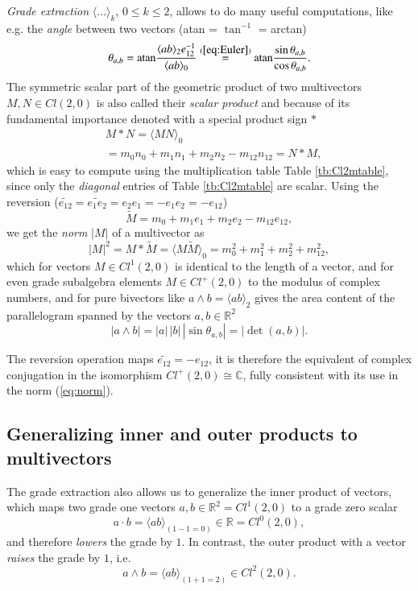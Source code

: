 \documentclass[cameraready]{jcmsi}%
\newcommand{\R}{\mathbb{R}}
\newcommand{\C}{\mathbb{C}}
\newcommand{\be}{\begin{equation}}
\newcommand{\ee}{\end{equation}}
\begin{document}
\textit{Grade extraction} $\langle \ldots \rangle_k$, $0 \leq k \leq 2$, allows to do many useful computations, like e.g. the \textit{angle} between two vectors (atan = $\tan^{-1}$ = arctan)
\be 
  \theta_{a,b} = \mathrm{atan} \frac{\langle ab \rangle_2 e_{12}^{-1}}{\langle ab \rangle_0}
               \stackrel{(\ref{eq:Euler})}{=} \mathrm{atan} \frac{\sin \theta_{a,b}}{\cos \theta_{a,b}} . 
\ee 
The symmetric scalar part of the geometric product of two multivectors $M,N \in Cl(2,0)$ is also called their \textit{scalar product} and because of its fundamental importance denoted with a special product sign $\ast$
\begin{align} 
  &M \ast N = \langle MN \rangle_0 
  \nonumber \\
  &= m_0n_0 + m_1n_1 + m_2 n_2 - m_{12}n_{12}=N\ast M ,
\end{align} 
which is easy to compute using the multiplication table Table \ref{tb:Cl2mtable}, since only the \textit{diagonal} entries of Table \ref{tb:Cl2mtable} are scalar. 
Using the reversion ($\widetilde{e_{12}}=\widetilde{e_{1}e_2}=e_2e_1 = -e_1e_2=-e_{12}$)
\be 
  \widetilde{M} = m_0 + m_1 e_1 + m_2 e_2 - m_{12} e_{12},
\ee  
we get the \textit{norm} $|M|$ of a multivector as 
\be 
  |M|^2 = M \ast \widetilde{M} = \langle M\widetilde{M} \rangle_0
  = m_0^2 + m_1^2 + m_2^2 + m_{12}^2 ,
  \label{eq:norm}
\ee 
which for vectors $M \in Cl^1(2,0)$ is identical to the length of a vector, and for even grade subalgebra elements $M \in Cl^+(2,0)$ to the modulus of complex numbers, and for pure bivectors like $a\wedge b = \langle ab \rangle_2$ gives the area content of the parallelogram spanned by the vectors $a,b \in \R^2$
\be 
  |a\wedge b| = |a|\,|b|\,|\sin \theta_{a,b}| = |\det(a,b)|.
\ee 

The reversion operation maps $\widetilde{e_{12}}=-e_{12}$, it is therefore the equivalent of complex conjugation in the isomorphism $Cl^+(2,0) \cong \C$, fully consistent with its use in the norm (\ref{eq:norm}). 



\subsection{Generalizing inner and outer products to multivectors}

The grade extraction also allows us to generalize the inner product of vectors, which maps two grade one vectors $a,b \in \R^2=Cl^1(2,0)$ to a grade zero scalar
\be 
  a \cdot b = \langle ab \rangle_{(1-1=0)} \in \R=Cl^0(2,0),
\ee 
and therefore \textit{lowers} the grade by $1$. In contrast, the outer product with a vector \textit{raises} the grade by $1$, i.e.
\be 
  a \wedge b = \langle ab \rangle_{(1+1=2)} \in Cl^2(2,0).
\ee 
\end{document}

